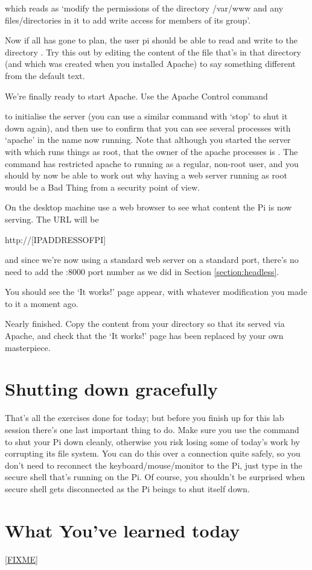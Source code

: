 which reads as `modify the permissions of the directory /var/www and any files/directories in it to add write access for members of its group'. 

Now if all has gone to plan, the user pi should be able to read and write to the directory . Try this out by editing the content of the  file that's in that directory (and which was created when you installed Apache) to say something different from the default text.

We're finally ready to start Apache. Use the Apache Control command


to initialise the server (you can use a similar command with `stop' to shut it down again), and then use  to confirm that you can see several processes with `apache' in the name now running. Note that although you started the server with  which runs things as root, that the owner of the apache processes is . The  command has restricted apache to running as a regular, non-root user, and you should by now be able to work out why having a web server running as root would be a Bad Thing from a security point of view.

On the desktop machine use a web browser to see what content the Pi is now serving. The URL will be 

\begin{ttoutenv}
http://[IPADDRESSOFPI]
\end{ttoutenv}

and since we're now using a standard web server on a standard port, there's no need to add the :8000 port number as we did in Section \ref{section:headless}. 

You should see the `It works!' page appear, with whatever modification you made to it a moment ago.

Nearly finished. Copy the content from your  directory so that its served via Apache, and check that the `It works!' page has been replaced by your own masterpiece.   

\section{Shutting down gracefully}

That's all the exercises done for today; but before you finish up for this lab session there's one last important thing to do. Make sure you use the  command to shut your Pi down cleanly, otherwise you risk losing some of today's work by corrupting its file system. You can do this over a  connection quite safely, so you don't need to reconnect the keyboard/mouse/monitor to the Pi, just type  in the secure shell that's running on the Pi. Of course, you shouldn't be surprised when secure shell gets disconnected as the Pi beings to shut itself down.

\section{What You've learned today}

\ref{FIXME}